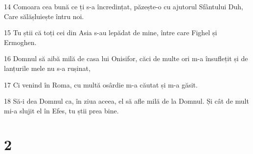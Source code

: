 \par 14 Comoara cea bună ce ți s-a încredințat, păzește-o cu ajutorul Sfântului Duh, Care sălășluiește întru noi.
\par 15 Tu știi că toți cei din Asia s-au lepădat de mine, între care Fighel și Ermoghen.
\par 16 Domnul să aibă milă de casa lui Onisifor, căci de multe ori m-a însuflețit și de lanțurile mele nu s-a rușinat,
\par 17 Ci venind în Roma, cu multă osârdie m-a căutat și m-a găsit.
\par 18 Să-i dea Domnul ca, în ziua aceea, el să afle milă de la Domnul. Și cât de mult mi-a slujit el în Efes, tu știi prea bine.

\chapter{2}

